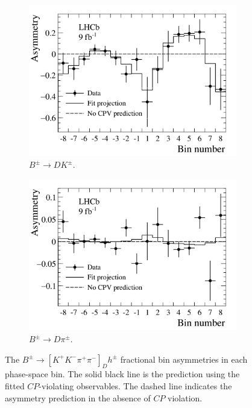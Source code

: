 \documentclass[12pt, a4paper, notitlepage, onecolumn]{article}
\begin{document}
\begin{figure}[htb]
    \centering
    \begin{subfigure}{0.5\textwidth}
        \includegraphics[width=1\textwidth]{Plots/BinAsymmetries_dk.png}
        \caption{$B^\pm\to DK^\pm$.}
        \label{figure:Bin_asymmetries_DK}
    \end{subfigure}%
    \begin{subfigure}{0.5\textwidth}
        \includegraphics[width=1\textwidth]{Plots/BinAsymmetries_dpi.png}
        \caption{$B^\pm\to D\pi^\pm$.}
        \label{figure:Bin_asymmetries_Dpi}
    \end{subfigure}
    \caption{The $B^\pm\to[K^+K^-\pi^+\pi^-]_D h^\pm$ fractional bin asymmetries in each phase-space bin. The solid black line is the prediction using the fitted $C\!P$-violating observables. The dashed line indicates the asymmetry prediction in the absence of $C\!P$ violation.}
    \label{figure:Bin_asymmetries}
\end{figure}
\end{document}
